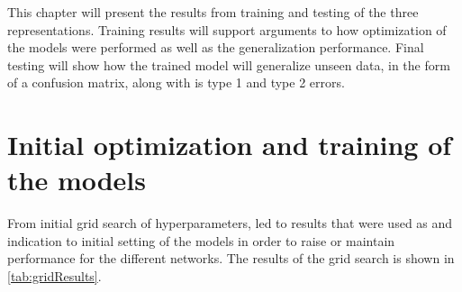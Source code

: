 This chapter will present the results from training and testing of the three representations. Training results will support arguments to how optimization of the models were performed as well as the generalization performance. Final testing will show how the trained model will generalize unseen data, in the form of a confusion matrix, along with is type 1 and type 2 errors. 

\section{Initial optimization and training of the models}
From initial grid search of hyperparameters, led to results that were used as and indication to initial setting of the models in order to raise or maintain performance for the different networks. The results of the grid search is shown in \autoref{tab:gridResults}. 


